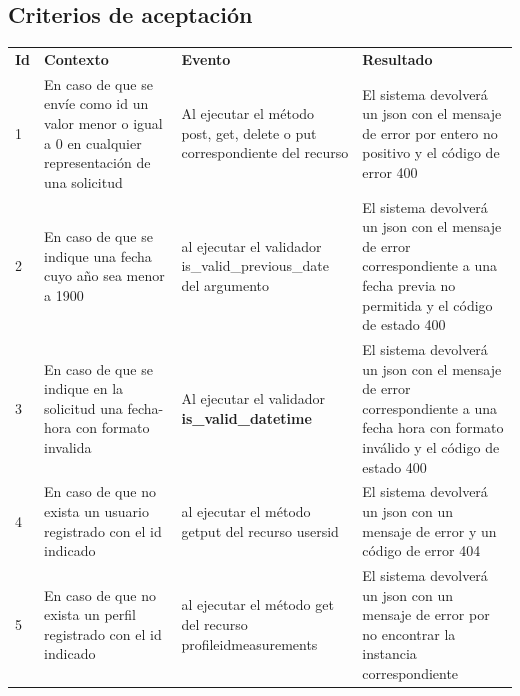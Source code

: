 \documentclass[a4paper,12pt]{article}
\begin{document}

\subsection{Criterios de aceptación}

\begin{center}
\begin{longtable}{|p{0.5cm}|p{4cm}|p{4cm}|p{5cm}|}
\hline \hline \rowcolor[gray]{0.9}
	\multicolumn{4}{||c|}{\textbf{Criterio de aceptación}} \\
    \hline  \rowcolor[gray]{0.9}
        \textbf{Id} &
        \textbf{Contexto} &
        \textbf{Evento}&
        \textbf{Resultado} \\
    \hline
1&En caso de que se envíe como id un valor menor o igual a 0 en cualquier representación  de una solicitud & Al ejecutar el método post, get, delete o put correspondiente del recurso & El sistema devolverá un json con el mensaje de error por entero no positivo y el código de error 400 \\ \hline
	\hline
2&En caso de que se indique una fecha cuyo año sea menor a 1900 & al ejecutar el validador is\_valid\_previous\_date del argumento  & El sistema devolverá un json con el mensaje de error correspondiente a una fecha previa no permitida y el código de estado 400 \\ 		\hline
	\hline
3&En caso de que se indique en la solicitud una fecha-hora con formato invalida 
& Al ejecutar el validador \textbf{ is\_valid\_datetime}  & El sistema devolverá un json con el mensaje de error correspondiente a una fecha hora con formato inválido y el código de estado 400\\ \hline
    \hline
4&En caso de que no exista un usuario registrado con el id indicado & al ejecutar el método get\/put del recurso \/users\/id  & El sistema devolverá un json con un mensaje de error y un código de error 404 \\ \hline
	\hline
5&En caso de que no exista un perfil registrado con el id indicado & al ejecutar el método get del recurso \/profile\/id\/measurements  & El sistema devolverá un json con un mensaje de error por no encontrar la instancia correspondiente \\ \hline

  \end{longtable}
\end{center}
\end{document}
